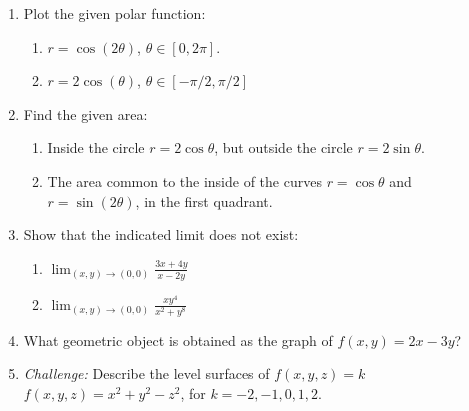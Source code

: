 \documentclass[12pt]{article}
\newcommand{\di}{\displaystyle}
\begin{document}
 \begin{enumerate}
\item Plot the given polar function:

\begin{enumerate}
\item $r=\cos(2\theta)$, $\theta\in [0,2\pi]$.

\vspace{4in}

\item $r=2\cos(\theta)$, $\theta\in [-\pi/2,\pi/2]$
\end{enumerate}
\newpage

\item Find the given area:
\begin{enumerate}
\item Inside the circle $r=2\cos\theta$, but outside the circle $r=2\sin\theta$.

\vspace{4in}

\item The area common to the inside of the curves $r=\cos\theta$ and $r=\sin(2\theta)$, in the first quadrant.
\end{enumerate}
\newpage

\item Show that the indicated limit does not exist:
\begin{enumerate}
\item $\di\lim_{(x,y)\to (0,0)}\frac{3x+4y}{x-2y}$

\vspace{1.5in}

\item $\di\lim_{(x,y)\to (0,0)}\frac{xy^4}{x^2+y^8}$

\vspace{1.5in}

\end{enumerate}

\item What geometric object is obtained as the graph of $f(x,y)=2x-3y$?

\vspace{1in}

\item \textit{Challenge:} Describe the level surfaces of $f(x,y,z)=k$ $f(x,y,z)=x^2+y^2-z^2$, for $k=-2,-1,0,1,2$.
\end{enumerate}
\end{document}
